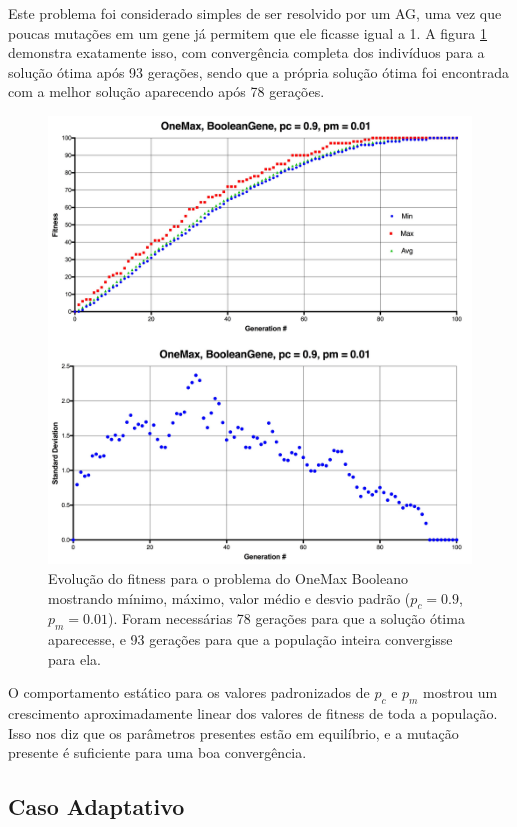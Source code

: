Este problema foi considerado simples de ser resolvido por um AG, uma vez que poucas mutações em um gene já permitem que ele ficasse igual a 1. A figura \ref{fig:onemax_boolean} demonstra exatamente isso, com convergência completa dos indivíduos para a solução ótima após 93 gerações, sendo que a própria solução ótima foi encontrada com a melhor solução aparecendo após 78 gerações.

\begin{figure}[ht!]
    \centering \includegraphics[width=1.0\textwidth]{onemax_boolean.jpg}
    \caption{Evolução do fitness para o problema do OneMax Booleano mostrando mínimo, máximo, valor médio e desvio padrão ($p_c=0.9$, $p_m=0.01$). Foram necessárias 78 gerações para que a solução ótima aparecesse, e 93 gerações para que a população inteira convergisse para ela.}
    \label{fig:onemax_boolean}
\end{figure}

O comportamento estático para os valores padronizados de $p_c$ e $p_m$ mostrou um crescimento aproximadamente linear dos valores de fitness de toda a população. Isso nos diz que os parâmetros presentes estão em equilíbrio, e a mutação presente é suficiente para uma boa convergência.

\subsection{Caso Adaptativo}


